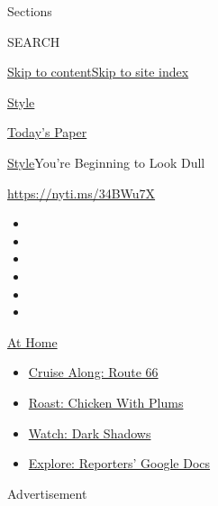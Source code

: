 Sections

SEARCH

\protect\hyperlink{site-content}{Skip to
content}\protect\hyperlink{site-index}{Skip to site index}

\href{https://www.nytimes3xbfgragh.onion/section/style}{Style}

\href{https://myaccount.nytimes3xbfgragh.onion/auth/login?response_type=cookie\&client_id=vi}{}

\href{https://www.nytimes3xbfgragh.onion/section/todayspaper}{Today's
Paper}

\href{/section/style}{Style}\textbar{}You're Beginning to Look Dull

\url{https://nyti.ms/34BWu7X}

\begin{itemize}
\item
\item
\item
\item
\item
\item
\end{itemize}

\href{https://www.nytimes3xbfgragh.onion/spotlight/at-home?action=click\&pgtype=Article\&state=default\&region=TOP_BANNER\&context=at_home_menu}{At
Home}

\begin{itemize}
\tightlist
\item
  \href{https://www.nytimes3xbfgragh.onion/2020/09/07/travel/route-66.html?action=click\&pgtype=Article\&state=default\&region=TOP_BANNER\&context=at_home_menu}{Cruise
  Along: Route 66}
\item
  \href{https://www.nytimes3xbfgragh.onion/2020/09/04/dining/sheet-pan-chicken.html?action=click\&pgtype=Article\&state=default\&region=TOP_BANNER\&context=at_home_menu}{Roast:
  Chicken With Plums}
\item
  \href{https://www.nytimes3xbfgragh.onion/2020/09/04/arts/television/dark-shadows-stream.html?action=click\&pgtype=Article\&state=default\&region=TOP_BANNER\&context=at_home_menu}{Watch:
  Dark Shadows}
\item
  \href{https://www.nytimes3xbfgragh.onion/interactive/2020/at-home/even-more-reporters-editors-diaries-lists-recommendations.html?action=click\&pgtype=Article\&state=default\&region=TOP_BANNER\&context=at_home_menu}{Explore:
  Reporters' Google Docs}
\end{itemize}

Advertisement

